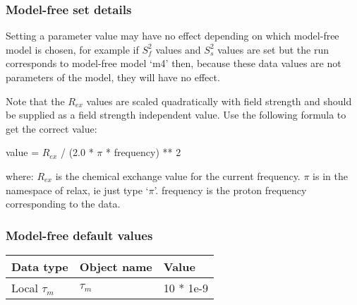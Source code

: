 \subsubsection{Model-free set details}

Setting a parameter value may have no effect depending on which model-free model is chosen,
for example if $S^2_f$ values and $S^2_s$ values are set but the run corresponds to model-free model
`m4' then, because these data values are not parameters of the model, they will have no
effect.

Note that the $R_{ex}$ values are scaled quadratically with field strength and should be supplied
as a field strength independent value.  Use the following formula to get the correct value:

    value = $R_{ex}$ / (2.0 * $\pi$ * frequency) ** 2

where:
    $R_{ex}$ is the chemical exchange value for the current frequency.
    $\pi$ is in the namespace of relax, ie just type `$\pi$'.
    frequency is the proton frequency corresponding to the data.


\subsubsection{Model-free default values}



\begin{center}
\begin{tabular}{lll}
\toprule
Data type & Object name & Value \\
\midrule
 Local $\tau_m$                               &  $\tau_m$            &  10 * 1e-9                     \\
\bottomrule
\end{tabular}
\end{center}

